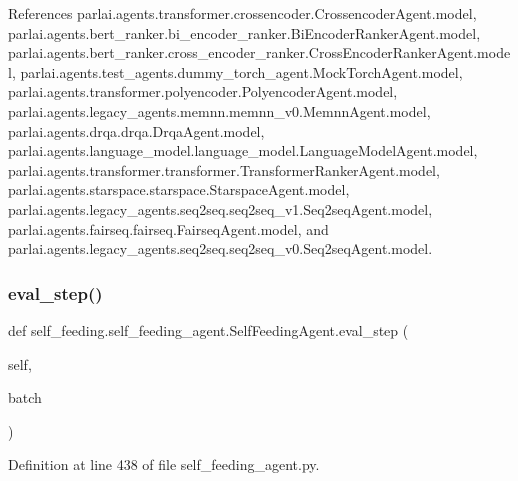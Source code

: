 References parlai.\+agents.\+transformer.\+crossencoder.\+Crossencoder\+Agent.\+model, parlai.\+agents.\+bert\+\_\+ranker.\+bi\+\_\+encoder\+\_\+ranker.\+Bi\+Encoder\+Ranker\+Agent.\+model, parlai.\+agents.\+bert\+\_\+ranker.\+cross\+\_\+encoder\+\_\+ranker.\+Cross\+Encoder\+Ranker\+Agent.\+model, parlai.\+agents.\+test\+\_\+agents.\+dummy\+\_\+torch\+\_\+agent.\+Mock\+Torch\+Agent.\+model, parlai.\+agents.\+transformer.\+polyencoder.\+Polyencoder\+Agent.\+model, parlai.\+agents.\+legacy\+\_\+agents.\+memnn.\+memnn\+\_\+v0.\+Memnn\+Agent.\+model, parlai.\+agents.\+drqa.\+drqa.\+Drqa\+Agent.\+model, parlai.\+agents.\+language\+\_\+model.\+language\+\_\+model.\+Language\+Model\+Agent.\+model, parlai.\+agents.\+transformer.\+transformer.\+Transformer\+Ranker\+Agent.\+model, parlai.\+agents.\+starspace.\+starspace.\+Starspace\+Agent.\+model, parlai.\+agents.\+legacy\+\_\+agents.\+seq2seq.\+seq2seq\+\_\+v1.\+Seq2seq\+Agent.\+model, parlai.\+agents.\+fairseq.\+fairseq.\+Fairseq\+Agent.\+model, and parlai.\+agents.\+legacy\+\_\+agents.\+seq2seq.\+seq2seq\+\_\+v0.\+Seq2seq\+Agent.\+model.

\mbox{\label{classself__feeding_1_1self__feeding__agent_1_1SelfFeedingAgent_a9f6ed50b9db65bede09f19810e05abc4}} 
\subsubsection{\texorpdfstring{eval\+\_\+step()}{eval\_step()}}
{\footnotesize\ttfamily def self\+\_\+feeding.\+self\+\_\+feeding\+\_\+agent.\+Self\+Feeding\+Agent.\+eval\+\_\+step (\begin{DoxyParamCaption}\item[{}]{self,  }\item[{}]{batch }\end{DoxyParamCaption})}



Definition at line 438 of file self\+\_\+feeding\+\_\+agent.\+py.



